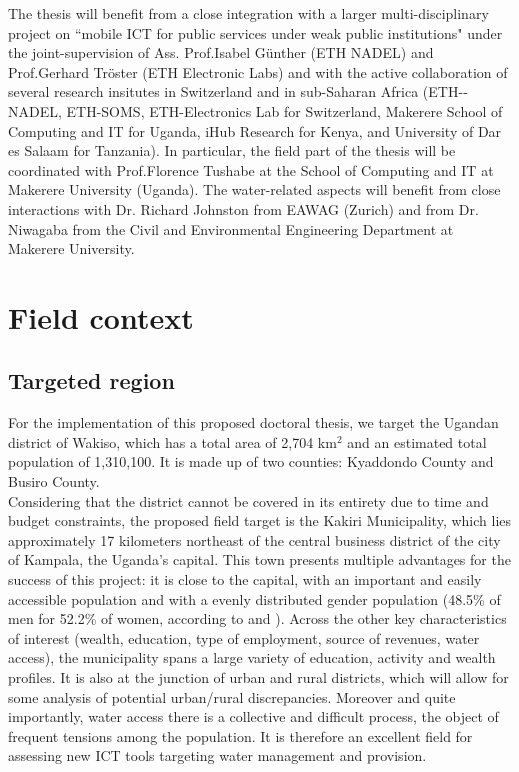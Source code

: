\documentclass[11pt]{article}
\begin{document}
The thesis will benefit from a close integration with a larger multi-disciplinary project on ``mobile ICT for public services under weak public institutions" under the joint-supervision of Ass. Prof.Isabel G\"{u}nther (ETH NADEL) and Prof.Gerhard Tr\"{o}ster (ETH Electronic Labs) and with the active collaboration of several research insitutes in Switzerland and in sub-Saharan Africa (ETH-­NADEL, ETH-­SOMS, ETH-­Electronics Lab for Switzerland, Makerere School of Computing and IT for Uganda, iHub Research for Kenya, and University of Dar es Salaam for Tanzania). In particular, the field part of the thesis will be coordinated with Prof.Florence Tushabe at the School of Computing and IT at Makerere University (Uganda). The water-related aspects will benefit from close interactions with Dr. Richard Johnston from EAWAG (Zurich) and from Dr. Niwagaba from the Civil and Environmental Engineering Department at Makerere University.  

\section{Field context}
\subsection{Targeted region}
For the implementation of this proposed doctoral thesis, we target the Ugandan district of Wakiso, which has a total area of 2,704 km$^{2}$ and an estimated total population of 1,310,100. It is made up of two counties: Kyaddondo County and Busiro County. 
\\
Considering that the district cannot be covered in its entirety due to time and budget constraints, the proposed field target is the Kakiri Municipality, which lies approximately 17 kilometers northeast of the central business district of the city of Kampala, the Uganda's capital. This town presents multiple advantages for the success of this project: it is close to the capital, with an important and easily accessible population and with a evenly distributed gender population (48.5\% of men for 52.2\% of women, according to \citep{population2010} and \citep{population02}). Across the other key characteristics of interest (wealth, education, type of employment, source of revenues, water access), the municipality spans a large variety of education, activity and wealth profiles. It is also at the junction of urban and rural districts, which will allow for some analysis of potential urban/rural discrepancies. Moreover and quite importantly, water access there is a collective and difficult process, the object of frequent tensions among the population. It is therefore an excellent field for assessing new ICT tools targeting water management and provision.
\end{document}
